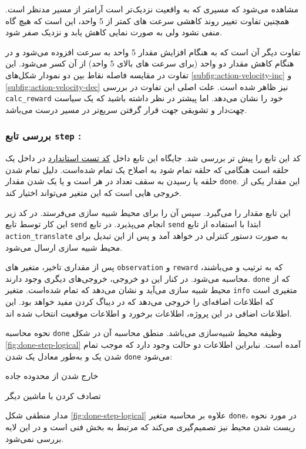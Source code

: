 مشاهده می‌شود که مسیری که به واقعیت نزدیک‌تر است آرامتر از مسیر مدنظر است. همچنین تفاوت تغییر روند کاهشی سرعت های کمتر از 5 واحد، این است که هیچ گاه منفی نشود ولی به صورت نمایی کاهش یابد و نزدیک صفر شود.

 تفاوت دیگر آن است که به هنگام افزایش مقدار 5 واحد به سرعت افزوده می‌شود و در هنگام کاهش مقدار دو واحد (برای سرعت های بالای 5 واحد) از آن کسر می‌شود. این تفاوت در مقایسه فاصله نقاط بین دو نمودار شکل‌های \ref{subfig:action-velocity-inc} و  \ref{subfig:action-velocity-dec} نیز ظاهر شده است. علت اصلی این تفاوت در بررسی \texttt{calc\_reward} خود را نشان می‌دهد. اما پیشتر در نظر داشته باشید که یک سیاست چهت‌دار و تشویقی جهت قرار گرفتن سریع‌تر در مسیر درست می‌باشد.
 
\subsubsection{بررسی تابع \textbf{\texttt{step} :}}

کد این تابع را پیش تر بررسی شد. جایگاه این تابع داخل 
\hyperref[code:standard-test]{کد تست استاندارد}
در داخل یک حلقه است هنگامی که حلقه تمام شود به اصلاح یک  تمام شده‌است. دلیل تمام شدن حلقه یا رسیدن به سقف تعداد  در هر  است و یا یک شدن مقدار \texttt{done}. این مقدار یکی از خروجی هایی است که این متغیر می‌تواند اختیار کند.
 
این تابع مقدار  را می‌گیرد. سپس آن را برای محیط شبیه سازی می‌فرستد. در کد زیر این کار توسط تابع \texttt{send} انجام می‌پذیرد. در تابع \texttt{send} ابتدا با استفاده از تابع \texttt{action\_translate} به صورت دستور کنترلی در خواهد آمد و پس از این تبدیل برای محیط شبیه سازی ارسال می‌شود.

پس از مقداری تاخیر، متغیر های \texttt{observation} و  \texttt{reward} که به ترتیب  و  می‌باشند، محاسبه می‌شود. در کنار این دو خروجی، خروجی‌های دیگری وجود دارند. \texttt{done} که از محیط شبیه سازی می‌آید و نشان می‌دهد که  تمام شده‌است. متغیر \texttt{info} متغیری است که اطلاعات اضافه‌ای را خروجی می‌دهد که در دیباگ کردن مفید خواهد بود. این اطلاعات اضافی در این پروژه، اطلاعات برخورد و اطلاعات موقعیت  انتخاب شده اند.

\begin{note}
	نحوه محاسبه \texttt{done} وظیفه محیط شبیه‌سازی می‌باشد. منطق محاسبه آن در شکل \ref{fig:done-step-logical} آمده است.  نبابراین اطلاعات دو حالت وجود دارد که موجب تمام شدن یک  و به‌طور معادل یک شدن \texttt{done} می‌شود: 
	\begin{alphabetlist}
		\item خارج شدن از محدوده جاده
		\item تصادف کردن با ماشین دیگر
	\end{alphabetlist}
\end{note}
\begin{note}
	مدار منطقی شکل \ref{fig:done-step-logical} علاوه بر محاسبه متغیر \texttt{done}، در مورد نحوه ریست شدن محیط نیز تصمیم‌گیری می‌کند که مرتبط به بخش فنی است و در این لایه بررسی ‌نمی‌شود.
\end{note}

